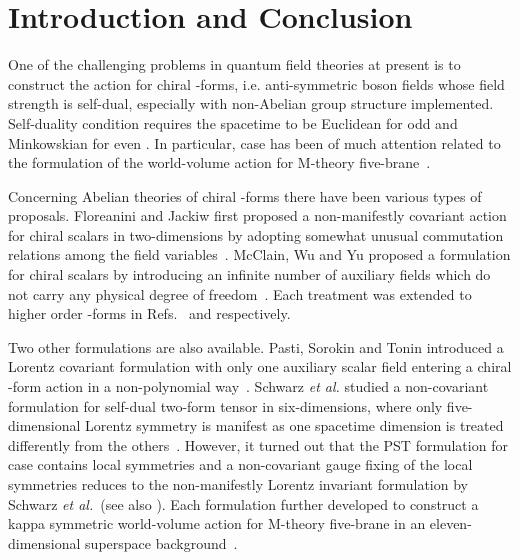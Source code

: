 \documentclass[a4paper,12pt]{article}
\begin{document}
\section{Introduction and Conclusion}
One of the challenging problems in quantum field theories at present  is  to construct  the action for chiral \coordHE{}-forms, i.e. anti-symmetric boson fields whose  field strength is self-dual, especially with non-Abelian group structure implemented. Self-duality condition requires the spacetime to be Euclidean for odd \coordHE{} and Minkowskian for even \coordHE{}.  In particular, \coordHE{} case has been of much attention related to the formulation of the world-volume action for M-theory five-brane~\cite{PLB27649,NPB36760,PRL713754,9510053,9602071,9610234,9611008}.\newline




\indent Concerning Abelian theories of chiral \coordHE{}-forms there have been various types of proposals.  Floreanini and Jackiw first proposed a non-manifestly covariant action for chiral scalars in two-dimensions by adopting somewhat unusual commutation relations  among the field variables~\cite{PRL591873}.   McClain, Wu and Yu proposed a formulation for chiral scalars  by  introducing an infinite number of auxiliary   fields which do not carry any physical degree of freedom~\cite{NPB343689}.  Each treatment was extended to higher order \coordHE{}-forms in Refs.~\cite{PLB206650} and \cite{9603031,9609102} respectively.       \newline


\indent Two other  formulations are also available. Pasti, Sorokin and Tonin introduced a Lorentz covariant formulation  with only one auxiliary scalar field entering a chiral \coordHE{}-form action in a non-polynomial way~\cite{9611100}.  Schwarz \textit{et al.} studied a non-covariant formulation for self-dual two-form tensor in six-dimensions, where only five-dimensional Lorentz symmetry is manifest as one spacetime dimension is treated differently from the others~\cite{9304154,9611065,9701008}. However, it turned out  that the PST formulation for \coordHE{} case contains local symmetries  and a non-covariant gauge fixing of the local symmetries reduces to the non-manifestly Lorentz invariant  formulation by Schwarz \textit{et al.}~\cite{9701037,9701166}(see also \cite{9503182,9506109,9509052}).  Each formulation further developed  to construct a kappa symmetric  world-volume action for M-theory five-brane in an eleven-dimensional  superspace background~\cite{9701149,9701166}.  \newline
\end{document}
